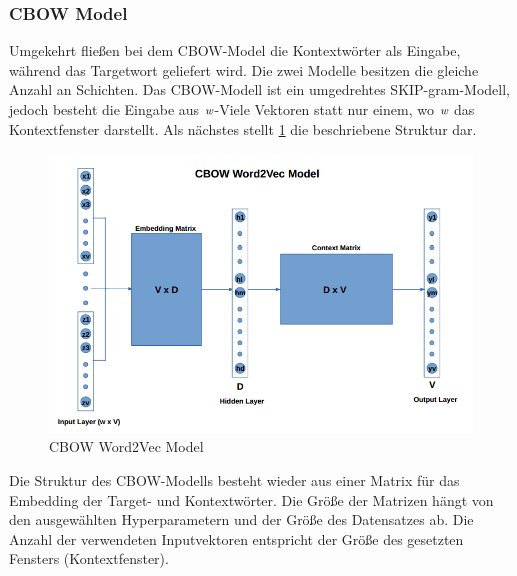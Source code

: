 \subsubsection{CBOW Model}
Umgekehrt fließen bei dem CBOW-Model die Kontextwörter als Eingabe, während das Targetwort geliefert wird. Die zwei Modelle besitzen die gleiche Anzahl an Schichten. Das CBOW-Modell ist ein umgedrehtes SKIP-gram-Modell, jedoch besteht die Eingabe aus $\emph{w}$-Viele Vektoren statt nur einem, wo $\emph{w}$ das Kontextfenster darstellt. Als nächstes stellt \cref{cbow} die beschriebene Struktur dar.

\begin{figure}[H]
	\centering
	\includegraphics[scale=0.6]{images/CBOW_Model.png}
	\caption{CBOW Word2Vec Model}
	\label{cbow}
\end{figure}

Die Struktur des CBOW-Modells besteht wieder aus einer Matrix für das Embedding der Target- und Kontextwörter. Die Größe der Matrizen hängt von den ausgewählten Hyperparametern und der Größe des Datensatzes ab. Die Anzahl der verwendeten Inputvektoren entspricht der Größe des gesetzten Fensters (Kontextfenster).

